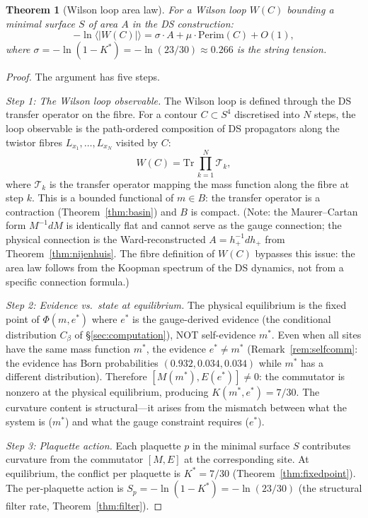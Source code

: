 \documentclass[11pt,a4paper]{article}
\newtheorem{theorem}{Theorem}[section]
\theoremstyle{definition}
\theoremstyle{remark}
\newcommand{\Tr}{\mathrm{Tr}}
\begin{document}
\begin{theorem}[Wilson loop area law]\label{thm:arealaw}
For a Wilson loop $W(C)$ bounding a minimal surface $S$ of area $A$ in the DS construction:
\begin{equation}\label{eq:arealaw}
-\ln\langle|W(C)|\rangle=\sigma\cdot A+\mu\cdot\mathrm{Perim}(C)+O(1),
\end{equation}
where $\sigma=-\ln(1-K^*)=-\ln(23/30)\approx 0.266$ is the string tension.
\end{theorem}

\begin{proof}
The argument has five steps.

\emph{Step 1: The Wilson loop observable.} The Wilson loop is defined through the DS transfer operator on the fibre. For a contour $C\subset S^4$ discretised into $N$ steps, the loop observable is the path-ordered composition of DS propagators along the twistor fibres $L_{x_1},\ldots,L_{x_N}$ visited by $C$:
\[
W(C)=\Tr\,\prod_{k=1}^{N}\mathcal{T}_k,
\]
where $\mathcal{T}_k$ is the transfer operator mapping the mass function along the fibre at step $k$. This is a bounded functional of $m\in B$: the transfer operator is a contraction (Theorem~\ref{thm:basin}) and $B$ is compact. (Note: the Maurer--Cartan form $M^{-1}dM$ is identically flat and cannot serve as the gauge connection; the physical connection is the Ward-reconstructed $A=h_+^{-1}dh_+$ from Theorem~\ref{thm:nijenhuis}. The fibre definition of $W(C)$ bypasses this issue: the area law follows from the Koopman spectrum of the DS dynamics, not from a specific connection formula.)

\emph{Step 2: Evidence vs.\ state at equilibrium.} The physical equilibrium is the fixed point of $\Phi(m,e^*)$ where $e^*$ is the gauge-derived evidence (the conditional distribution $C_\beta$ of \S\ref{sec:computation}), NOT self-evidence $m^*$. Even when all sites have the same mass function $m^*$, the evidence $e^*\neq m^*$ (Remark~\ref{rem:selfcomm}: the evidence has Born probabilities $(0.932,0.034,0.034)$ while $m^*$ has a different distribution). Therefore $[M(m^*),E(e^*)]\neq 0$: the commutator is nonzero at the physical equilibrium, producing $K(m^*,e^*)=7/30$. The curvature content is structural---it arises from the mismatch between what the system is ($m^*$) and what the gauge constraint requires ($e^*$).

\emph{Step 3: Plaquette action.} Each plaquette $p$ in the minimal surface $S$ contributes curvature from the commutator $[M,E]$ at the corresponding site. At equilibrium, the conflict per plaquette is $K^*=7/30$ (Theorem~\ref{thm:fixedpoint}). The per-plaquette action is $S_p=-\ln(1-K^*)=-\ln(23/30)$ (the structural filter rate, Theorem~\ref{thm:filter}).


\end{proof}
\end{document}
